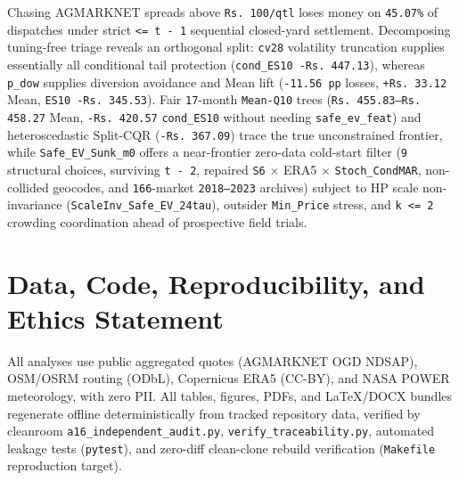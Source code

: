 \documentclass[11pt,a4paper]{article}
\begin{document}
Chasing AGMARKNET spreads above \texttt{Rs.\,100/qtl} loses money on \texttt{45.07\%} of dispatches under strict \texttt{<= t - 1} sequential closed-yard settlement. Decomposing tuning-free triage reveals an orthogonal split: \texttt{cv28} volatility truncation supplies essentially all conditional tail protection (\texttt{cond\_ES10 -Rs.\,447.13}), whereas \texttt{p\_dow} supplies diversion avoidance and Mean lift (\texttt{-11.56 pp} losses, \texttt{+Rs.\,33.12} Mean, \texttt{ES10 -Rs.\,345.53}). Fair \texttt{17}-month \texttt{Mean-Q10} trees (\texttt{Rs.\,455.83--Rs.\,458.27} Mean, \texttt{-Rs.\,420.57} \texttt{cond\_ES10} without needing \texttt{safe\_ev\_feat}) and heteroscedastic Split-CQR (\texttt{-Rs.\,367.09}) trace the true unconstrained frontier, while \texttt{Safe\_EV\_Sunk\_m0} offers a near-frontier zero-data cold-start filter (\texttt{9} structural choices, surviving \texttt{t - 2}, repaired \texttt{S6} $\times$ ERA5 $\times$ \texttt{Stoch\_CondMAR}, non-collided geocodes, and \texttt{166}-market \texttt{2018--2023} archives) subject to HP scale non-invariance (\texttt{ScaleInv\_Safe\_EV\_24tau}), outsider \texttt{Min\_Price} stress, and \texttt{k <= 2} crowding coordination ahead of prospective field trials.

\section{Data, Code, Reproducibility, and Ethics Statement}

All analyses use public aggregated quotes (AGMARKNET OGD NDSAP), OSM/OSRM routing (ODbL), Copernicus ERA5 (CC-BY), and NASA POWER meteorology, with zero PII. All tables, figures, PDFs, and LaTeX/DOCX bundles regenerate offline deterministically from tracked repository data, verified by cleanroom \texttt{a16\_independent\_audit.py}, \texttt{verify\_traceability.py}, automated leakage tests (\texttt{pytest}), and zero-diff clean-clone rebuild verification (\texttt{Makefile} reproduction target).



\end{document}
